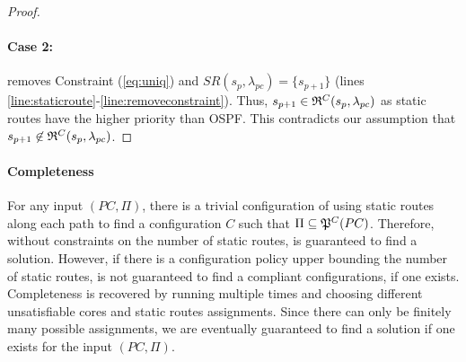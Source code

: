 \begin{proof}
\paragraph{Case 2:}  
 removes Constraint (\ref{eq:uniq}) 
and $SR(s_p, \lambda_{pc}) = \{s_{p+1}\}$ (lines \ref{line:staticroute}-\ref{line:removeconstraint}). 
Thus, $s_{p+1} \in \mathfrak{R}^C(s_{p}, \lambda_{pc})$ as static routes 
have the higher priority than OSPF. This contradicts our assumption
that $s_{p+1} \not\in \mathfrak{R}^C(s_{p}, \lambda_{pc})$. 
\end{proof}
\fi

\paragraph{Completeness}
For any input $(PC, \Pi)$, there is a trivial configuration of using static
routes along each path to find a configuration $C$ such that  
$\Pi\subseteq\mathfrak{P}^C(PC)$. Therefore, without constraints on the
number of static routes, \name is guaranteed to find a solution.
However, if there is a configuration policy 
upper bounding the number of static routes,  is not guaranteed 
to find a compliant configurations, if one exists. 
Completeness is recovered by running  multiple times and choosing different
unsatisfiable cores and static routes assignments. Since there can only be finitely many
possible assignments, we are eventually 
guaranteed to find a solution if one exists for the input $(PC, \Pi)$.